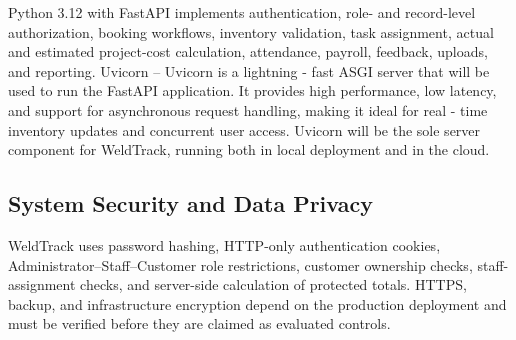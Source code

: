 \documentclass[12pt, letterpaper]{article}
\begin{document}
\hspace*{2em} Python 3.12 with FastAPI implements authentication, role- and record-level authorization, booking workflows, inventory validation, task assignment, actual and estimated project-cost calculation, attendance, payroll, feedback, uploads, and reporting.
\hspace*{2em} Uvicorn – Uvicorn is a lightning - fast ASGI server that will be used to run the FastAPI application. It provides high performance, low latency, and support for asynchronous request handling, making it ideal for real - time inventory updates and concurrent user access. Uvicorn will be the sole server component for WeldTrack, running both in local deployment and in the cloud.

\subsection{System Security and Data Privacy}
\hspace*{2em} WeldTrack uses password hashing, HTTP-only authentication cookies, Administrator--Staff--Customer role restrictions, customer ownership checks, staff-assignment checks, and server-side calculation of protected totals. HTTPS, backup, and infrastructure encryption depend on the production deployment and must be verified before they are claimed as evaluated controls.
\end{document}
